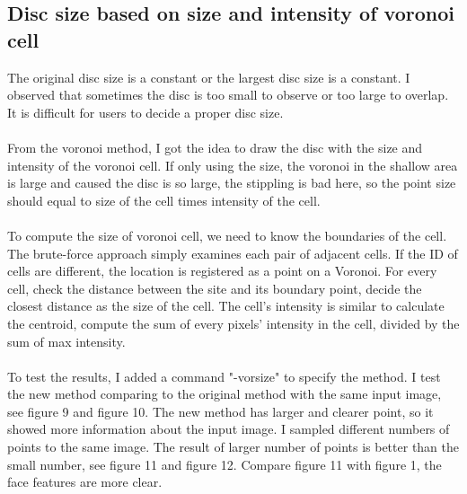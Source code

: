 \documentclass[11pt]{article}
\begin{document}
\subsection{Disc size based on size and intensity of voronoi cell}
The original disc size is a constant or the largest disc size is a constant. I observed that sometimes the disc is too small to observe or too large to overlap. It is difficult for users to decide a proper disc size.
\\\\ From the voronoi method, I got the idea to draw the disc with the size and intensity of the voronoi cell.
If only using the size, the voronoi in the shallow area is large and caused the disc is so large, the stippling is bad here, so the point size should equal to size of the cell times intensity of the cell.
\\\\To compute the size of voronoi cell, we need to know the boundaries of the cell. The brute-force approach simply examines each pair of adjacent cells. If the ID of cells are different, the location is registered as a point on a Voronoi. For every cell, check the distance between the site and its boundary point, decide the closest distance as the size of the cell. The cell's intensity is similar to calculate the centroid, compute the sum of every pixels' intensity in the cell, divided by the sum of max intensity. 
\\\\To test the results, I added a command "-vorsize" to specify the method. I test the new method comparing to the original method with the same input image, see figure 9 and figure 10. The new method has larger and clearer point, so it showed more information about the input image. I sampled different numbers of points to the same image. The result of larger number of points is better than the small number, see figure 11 and figure 12. Compare figure 11 with figure 1, the face features are more clear. 
   
\end{document}
